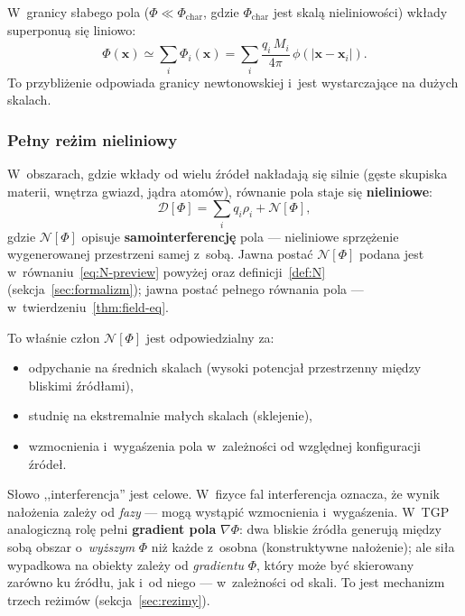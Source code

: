 W~granicy s\l{}abego pola ($\Phi \ll \Phi_{\mathrm{char}}$, gdzie
$\Phi_{\mathrm{char}}$ jest skal\k{a} nieliniowo\'sci) wk\l{}ady
superponu\k{a} si\k{e} liniowo:
\begin{equation}\label{eq:Phi-linear}
    \Phi(\mathbf{x})
    \simeq \sum_{i} \Phi_i(\mathbf{x})
    = \sum_{i} \frac{q_i\,M_i}{4\pi}\,\phi(|\mathbf{x}-\mathbf{x}_i|).
\end{equation}
To przybli\.zenie odpowiada granicy newtonowskiej i~jest
wystarczaj\k{a}ce na du\.zych skalach.

\subsubsection{Pe\l{}ny re\.zim nieliniowy}

W~obszarach, gdzie wk\l{}ady od wielu \'zr\'ode\l{} nak\l{}adaj\k{a} si\k{e}
silnie (g\k{e}ste skupiska materii, wn\k{e}trza gwiazd, j\k{a}dra atom\'ow),
r\'ownanie pola staje si\k{e} \textbf{nieliniowe}:
\begin{equation}\label{eq:Phi-nonlinear}
    \mathcal{D}[\Phi]
    = \sum_{i} q_i \rho_i
    + \mathcal{N}[\Phi],
\end{equation}
gdzie $\mathcal{N}[\Phi]$ opisuje \textbf{samointerferencj\k{e}}
pola --- nieliniowe sprz\k{e}\.zenie wygenerowanej przestrzeni
samej z~sob\k{a}. Jawna posta\'c $\mathcal{N}[\Phi]$ podana jest
w~r\'ownaniu~\eqref{eq:N-preview} powy\.zej
oraz definicji~\ref{def:N} (sekcja~\ref{sec:formalizm});
jawna posta\'c pe\l{}nego r\'ownania pola ---
w~twierdzeniu~\ref{thm:field-eq}.

To w\l{}a\'snie cz\l{}on $\mathcal{N}[\Phi]$ jest odpowiedzialny za:
\begin{itemize}[nosep]
  \item odpychanie na \'srednich skalach (wysoki potencja\l{}
        przestrzenny mi\k{e}dzy bliskimi \'zr\'od\l{}ami),
  \item studni\k{e} na ekstremalnie ma\l{}ych skalach (sklejenie),
  \item wzmocnienia i~wyga\'szenia pola w~zale\.zno\'sci od
        wzgl\k{e}dnej konfiguracji \'zr\'ode\l{}.
\end{itemize}

\begin{remark}
S\l{}owo ,,interferencja'' jest celowe. W~fizyce fal interferencja
oznacza, \.ze wynik na\l{}o\.zenia zale\.zy od \emph{fazy} --- mog\k{a}
wyst\k{a}pi\'c wzmocnienia i~wyga\'szenia. W~TGP analogiczn\k{a} rol\k{e}
pe\l{}ni \textbf{gradient pola} $\nabla\Phi$: dwa bliskie \'zr\'od\l{}a
generuj\k{a} mi\k{e}dzy sob\k{a} obszar o~\emph{wy\.zszym} $\Phi$ ni\.z ka\.zde
z~osobna (konstruktywne na\l{}o\.zenie); ale si\l{}a wypadkowa na obiekty
zale\.zy od \emph{gradientu} $\Phi$, kt\'ory mo\.ze by\'c skierowany
zar\'owno ku \'zr\'od\l{}u, jak i~od niego --- w~zale\.zno\'sci od skali.
To jest mechanizm trzech re\.zim\'ow (sekcja~\ref{sec:rezimy}).
\end{remark}

